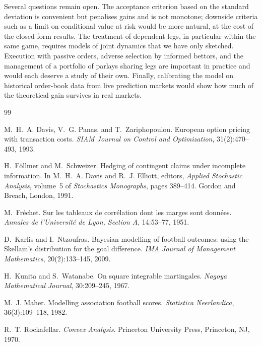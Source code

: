 \documentclass[11pt,a4paper]{article}
\theoremstyle{plain}
\theoremstyle{definition}
\theoremstyle{remark}
\newcommand{\1}{\mathbf{1}}
\begin{document}
Several questions remain open. The acceptance criterion based on the standard deviation is convenient but penalises gains and is not monotone; downside criteria such as a limit on conditional value at risk would be more natural, at the cost of the closed-form results. The treatment of dependent legs, in particular within the same game, requires models of joint dynamics that we have only sketched. Execution with passive orders, adverse selection by informed bettors, and the management of a portfolio of parlays sharing legs are important in practice and would each deserve a study of their own. Finally, calibrating the model on historical order-book data from live prediction markets would show how much of the theoretical gain survives in real markets.

\begin{thebibliography}{99}

M.~H.~A. Davis, V.~G. Panas, and T.~Zariphopoulou.
\newblock European option pricing with transaction costs.
\newblock \emph{SIAM Journal on Control and Optimization}, 31(2):470--493, 1993.

H.~Föllmer and M.~Schweizer.
\newblock Hedging of contingent claims under incomplete information.
\newblock In M.~H.~A. Davis and R.~J. Elliott, editors, \emph{Applied Stochastic Analysis}, volume~5 of \emph{Stochastics Monographs}, pages 389--414. Gordon and Breach, London, 1991.

M.~Fréchet.
\newblock Sur les tableaux de corrélation dont les marges sont données.
\newblock \emph{Annales de l'Université de Lyon, Section A}, 14:53--77, 1951.

D.~Karlis and I.~Ntzoufras.
\newblock Bayesian modelling of football outcomes: using the Skellam's distribution for the goal difference.
\newblock \emph{IMA Journal of Management Mathematics}, 20(2):133--145, 2009.

H.~Kunita and S.~Watanabe.
\newblock On square integrable martingales.
\newblock \emph{Nagoya Mathematical Journal}, 30:209--245, 1967.

M.~J. Maher.
\newblock Modelling association football scores.
\newblock \emph{Statistica Neerlandica}, 36(3):109--118, 1982.

R.~T. Rockafellar.
\newblock \emph{Convex Analysis}.
\newblock Princeton University Press, Princeton, NJ, 1970.


\end{thebibliography}
\end{document}
